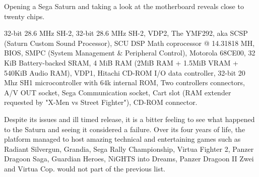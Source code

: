 \par
Opening a Sega Saturn and taking a look at the motherboard reveals close to twenty chips.\\
\par
{} 32-bit 28.6 MHz SH-2, 
 32-bit 28.6 MHz SH-2, 
 VDP2, 
 The YMF292, aka SCSP (Saturn Custom Sound Processor), 
 SCU DSP Math coprocessor @ 14.31818 MH, 
 BIOS, 
 SMPC (System Management \& Peripheral Control), 
 Motorola 68CE00, 
 32 KiB Battery-backed SRAM, 
 4 MiB RAM (2MiB RAM + 1.5MiB VRAM + 540KiB Audio RAM), 
 VDP1, 
 Hitachi CD-ROM I/O data controller, 
 32-bit 20 Mhz SH1  microcontroller with 64k internal ROM, 
 Two controllers connectors, 
 A/V OUT socket,  
 Sega Communication socket,  
 Cart slot (RAM extender requested by "X-Men vs Street Fighter"), 
 CD-ROM connector.






Despite its issues and ill timed release, it is a bitter feeling to see what happened to the Saturn and seeing it considered a failure. Over its four years of life, the platform managed to host amazing technical and entertaining games such as Radiant Silvergun, Grandia, Sega Rally Championship, Virtua Fighter 2, Panzer Dragoon Saga, Guardian Heroes, NiGHTS into Dreams, Panzer Dragoon II Zwei and Virtua Cop. \doom{} would not part of the previous list.\\
\par
{}


